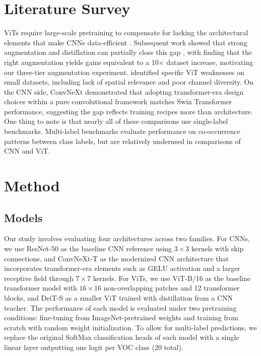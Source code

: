\documentclass{article}
\begin{document}
\section{Literature Survey}

ViTs require large-scale pretraining to compensate for lacking the architectural elements that make CNNs data-efficient \citep{dosovitskiy2021}. Subsequent work showed that strong augmentation and distillation can partially close this gap \citep{touvron2021, steiner2022}, with \citet{steiner2022} finding that the right augmentation yields gains equivalent to a 10$\times$ dataset increase, motivating our three-tier augmentation experiment. \citet{lu2022} identified specific ViT weaknesses on small datasets, including lack of spatial relevance and poor channel diversity. On the CNN side, ConvNeXt \citep{liu2022} demonstrated that adopting transformer-era design choices within a pure convolutional framework matches Swin Transformer \citep{liu2021} performance, suggesting the gap reflects training recipes more than architecture. One thing to note is that nearly all of these comparisons use single-label benchmarks. Multi-label benchmarks evaluate performance on co-occurrence patterns between class labels, but are relatively underused in comparisons of CNN and ViT.


\section{Method}

\subsection{Models}

Our study involves evaluating four architectures across two families. For CNNs, we use ResNet-50 as the baseline CNN reference using $3 \times 3$ kernels with skip connections, and ConvNeXt-T as the modernized CNN architecture that incorporates transformer-era elements such as GELU activation and a larger receptive field through $7 \times 7$ kernels. For ViTs, we use ViT-B/16 as the baseline transformer model with $16 \times 16$ non-overlapping patches and 12 transformer blocks, and DeiT-S as a smaller ViT trained with distillation from a CNN teacher. The performance of each model is evaluated under two pretraining conditions: fine-tuning from ImageNet-pretrained weights and training from scratch with random weight initialization. To allow for multi-label predictions, we replace the original SoftMax classification heads of each model with a single linear layer outputting one logit per VOC class (20 total).
\end{document}
